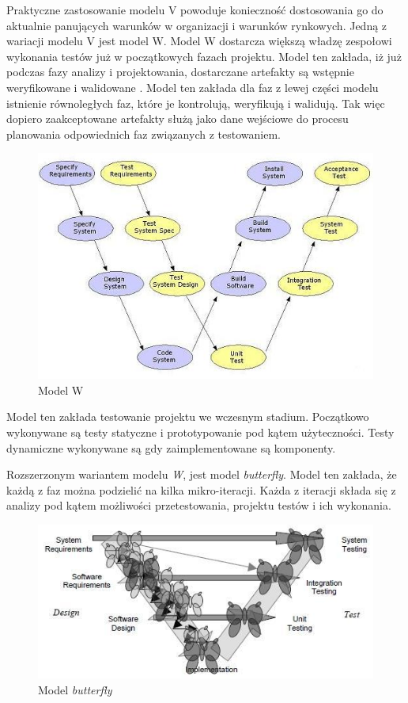 Praktyczne zastosowanie modelu V powoduje konieczność dostosowania go do aktualnie panujących warunków w organizacji i warunków rynkowych. Jedną z wariacji modelu V jest model W. Model W dostarcza większą władzę zespołowi wykonania testów już w początkowych fazach projektu. Model ten zakłada, iż już podczas fazy analizy i projektowania, dostarczane artefakty są wstępnie weryfikowane i walidowane \cite{wmodel}. Model ten zakłada dla faz z lewej części modelu istnienie równoległych faz, które je kontrolują, weryfikują i walidują. Tak więc dopiero zaakceptowane artefakty służą jako dane wejściowe do procesu planowania odpowiednich faz związanych z testowaniem.

\begin{figure}[h!]
\centerline{\includegraphics[scale=0.7]{img/Wmodel3.JPG}}
\caption{Model W  \cite{wmodel}}
\label{fig:wmodel}
\end{figure}


Model ten zakłada testowanie projektu we wczesnym stadium. Początkowo wykonywane są testy statyczne i prototypowanie pod kątem użyteczności. Testy dynamiczne wykonywane są gdy zaimplementowane są komponenty.


Rozszerzonym wariantem modelu \textit{W}, jest model \textit{butterfly}\cite{BUTTERFLY}. Model ten zakłada, że każdą z faz można podzielić na kilka mikro-iteracji. Każda z iteracji składa się z analizy pod kątem możliwości przetestowania, projektu testów i ich wykonania. 
\begin{figure}[h]
\centerline{\includegraphics[scale=0.5]{img/butterflymodel2.JPG}}
\caption{Model \textit{butterfly} \cite{BUTTERFLY}} 
\label{fig:vmodel}
\end{figure}
